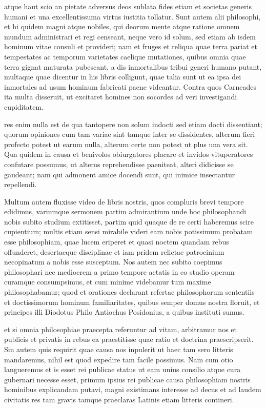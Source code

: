  atque haut scio an pietate adversus deos sublata fides etiam et societas generis humani et una excellentissuma virtus iustitia tollatur. Sunt autem alii philosophi, et hi quidem magni atque nobiles, qui deorum mente atque ratione omnem mundum administrari et regi censeant, neque vero id solum, sed etiam ab isdem hominum vitae consuli et provideri; nam et fruges et reliqua quae terra pariat et tempestates ac temporum varietates caelique mutationes, quibus omnia quae terra gignat maturata pubescant, a dis inmortalibus tribui generi humano putant, multaque quae dicentur in his libris colligunt, quae talia sunt ut ea ipsa dei inmortales ad usum hominum fabricati paene videantur. Contra quos Carneades ita multa disseruit, ut excitaret homines non socordes ad veri investigandi cupiditatem.

 res enim nulla est de qua tantopere non solum indocti sed etiam docti dissentiant; quorum opiniones cum tam variae sint tamque inter se dissidentes, alterum fieri profecto potest ut earum nulla, alterum certe non potest ut plus una vera sit. Qua quidem in causa et benivolos obiurgatores placare et invidos vituperatores confutare possumus, ut alteros reprehendisse paeniteat, alteri didicisse se gaudeant; nam qui admonent amice docendi sunt, qui inimice insectantur repellendi.

 Multum autem fluxisse video de libris nostris, quos compluris brevi tempore edidimus, variumque sermonem partim admirantium unde hoc philosophandi nobis subito studium extitisset, partim quid quaque de re certi haberemus scire cupientium; multis etiam sensi mirabile videri eam nobis potissimum probatam esse philosophiam, quae lucem eriperet et quasi noctem quandam rebus offunderet, desertaeque disciplinae et iam pridem relictae patrocinium necopinatum a nobis esse susceptum. Nos autem nec subito coepimus philosophari nec mediocrem a primo tempore aetatis in eo studio operam curamque consumpsimus, et cum minime videbamur tum maxime philosophabamur; quod et orationes declarant refertae philosophorum sententiis et doctissimorum hominum familiaritates, quibus semper domus nostra floruit, et principes illi Diodotus Philo Antiochus Posidonius, a quibus instituti sumus.

 et si omnia philosophiae praecepta referuntur ad vitam, arbitramur nos et publicis et privatis in rebus ea praestitisse quae ratio et doctrina praescripserit. Sin autem quis requirit quae causa nos inpulerit ut haec tam sero litteris mandaremus, nihil est quod expedire tam facile possimus. Nam cum otio langueremus et is esset rei publicae status ut eam unius consilio atque cura gubernari necesse esset, primum ipsius rei publicae causa philosophiam nostris hominibus explicandam putavi, magni existimans interesse ad decus et ad laudem civitatis res tam gravis tamque praeclaras Latinis etiam litteris contineri.

